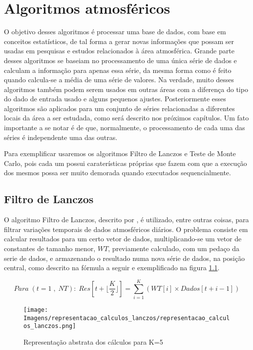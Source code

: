 \chapter{Algoritmos atmosféricos}\label{cap:algs_atmosfericos}

O objetivo desses algoritmos é processar uma base de dados, com base em conceitos estatísticos, de tal forma a gerar novas informações que possam ser usadas em pesquisas e estudos relacionados à área atmosférica. Grande parte desses algoritmos se baseiam no processamento de uma única série de dados e calculam a informação para apenas essa série, da mesma forma como é feito quando calcula-se a média de uma série de valores. Na verdade, muito desses algoritmos também podem serem usados em outras áreas com a diferença do tipo do dado de entrada usado e alguns pequenos ajustes. Posteriormente esses algoritmos são aplicados para um conjunto de séries relacionadas a diferentes locais da área a ser estudada, como será descrito nos próximos capítulos. Um fato importante a se notar é de que, normalmente, o processamento de cada uma das séries é independente uma das outras. 

Para exemplificar usaremos os algoritmos Filtro de Lanczos e Teste de Monte Carlo, pois cada um possui caraterísticas próprias que fazem com que a execução dos mesmos possa ser muito demorada quando executados sequencialmente.

\section{Filtro de Lanczos}

O algoritmo Filtro de Lanczos, descrito por \cite{Duchon:1979}, é utilizado, entre outras coisas, para filtrar variações temporais de dados atmosféricos diários. O problema consiste em calcular resultados para um certo vetor de dados, multiplicando-se um vetor de constantes de tamanho menor, $WT$, previamente calculado, com um pedaço da serie de dados, e armazenando o resultado numa nova série de dados, na posição central, como descrito na fórmula a seguir e exemplificado na figura \ref{fig:representacao_calculos_lanczos}.

\[
Para \; (t=1\;,\;NT): \;
Res[t + \lfloor \frac{K}{2} \rfloor ]=\sum _{i=1} ^{K} ( WT[i] \times Dados[t+i-1] )
\]

\begin{figure}[H]
\centering
\texttt{[image: Imagens/representacao\_calculos\_lanczos/representacao\_calculos\_lanczos.png]}
\caption{Representação abstrata dos cálculos para K=5}
\label{fig:representacao_calculos_lanczos}
\end{figure}


